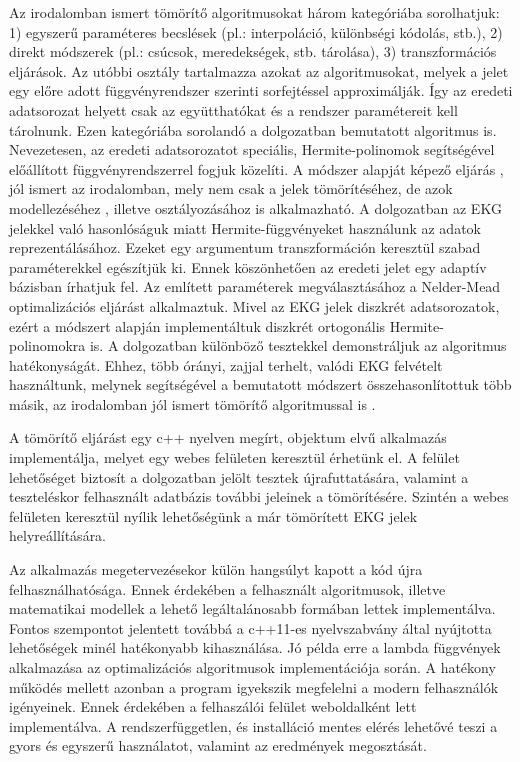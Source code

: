 \documentclass[oneside,titlepage,12pt,a4paper]{report}
\begin{document}
Az irodalomban ismert tömörítő algoritmusokat \cite{ecgDataCompressionTech} három kategóriába sorolhatjuk: 1) egyszerű paraméteres becslések (pl.: interpoláció, különbségi kódolás, stb.), 2) direkt módszerek (pl.: csúcsok, meredekségek, stb. tárolása), 3) transzformációs eljárások. Az utóbbi osztály tartalmazza azokat az algoritmusokat, melyek a jelet egy előre adott függvényrendszer szerinti sorfejtéssel approximálják. Így az eredeti adatsorozat helyett csak az együtthatókat és a rendszer paramétereit kell tárolnunk. Ezen kategóriába sorolandó a dolgozatban bemutatott algoritmus is. Nevezetesen, az eredeti adatsorozatot speciális, Hermite-polinomok segítségével előállított függvényrendszerrel fogjuk közelíti. A módszer alapját képező eljárás \cite{origCikk}, jól ismert az irodalomban, mely nem csak a jelek tömörítéséhez, de azok modellezéséhez \cite{methodForQRSEval}, illetve osztályozásához \cite{detAcuteMyo, clusterMaps} is alkalmazható. A dolgozatban az EKG jelekkel való hasonlóságuk miatt Hermite-függvényeket használunk az adatok reprezentálásához. Ezeket egy argumentum transzformáción keresztül szabad paraméterekkel egészítjük ki. Ennek köszönhetően az eredeti jelet egy adaptív bázisban írhatjuk fel. Az említett paraméterek megválasztásához a Nelder-Mead optimalizációs eljárást alkalmaztuk. Mivel az EKG jelek diszkrét adatsorozatok, ezért a módszert \cite{kvadCikk} alapján implementáltuk diszkrét ortogonális Hermite-polinomokra is. A dolgozatban különböző tesztekkel demonstráljuk az algoritmus hatékonyságát. Ehhez, több órányi, zajjal terhelt, valódi EKG felvételt használtunk, melynek segítségével a bemutatott módszert összehasonlítottuk több másik, az irodalomban jól ismert tömörítő algoritmussal is \cite{ecgCompIrregular}. 

A tömörítő eljárást egy c++ nyelven megírt, objektum elvű alkalmazás implementálja, melyet egy webes felületen keresztül érhetünk el. A felület lehetőséget biztosít a dolgozatban jelölt tesztek újrafuttatására, valamint a teszteléskor felhasznált adatbázis további jeleinek a tömörítésére. Szintén a webes felületen keresztül nyílik lehetőségünk a már tömörített EKG jelek helyreállítására. 

Az alkalmazás megetervezésekor külön hangsúlyt kapott a kód újra felhasználhatósága. Ennek érdekében a felhasznált algoritmusok, illetve matematikai modellek a lehető legáltalánosabb formában lettek implementálva. Fontos szempontot jelentett továbbá a c++11-es nyelvszabvány által nyújtotta lehetőségek minél hatékonyabb kihasználása. Jó példa erre a lambda függvények alkalmazása az optimalizációs algoritmusok implementációja során. A hatékony működés mellett azonban a program igyekszik megfelelni a modern felhasználók igényeinek. Ennek érdekében a felhaszálói felület weboldalként lett implementálva. A rendszerfüggetlen, és installáció mentes elérés lehetővé teszi a gyors és egyszerű használatot, valamint az eredmények megosztását.  
\end{document}
